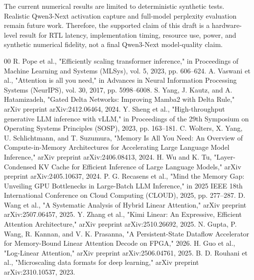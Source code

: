 \documentclass[conference]{IEEEtran}
\begin{document}
The current numerical results are limited to deterministic synthetic tests. Realistic Qwen3-Next activation capture and full-model perplexity evaluation remain future work. Therefore, the supported claim of this draft is a hardware-level result for RTL latency, implementation timing, resource use, power, and synthetic numerical fidelity, not a final Qwen3-Next model-quality claim.

\begin{thebibliography}{00}
 R. Pope et al., "Efficiently scaling transformer inference," in Proceedings of Machine Learning and Systems (MLSys), vol. 5, 2023, pp. 606--624.
 A. Vaswani et al., "Attention is all you need," in Advances in Neural Information Processing Systems (NeurIPS), vol. 30, 2017, pp. 5998--6008.
 S. Yang, J. Kautz, and A. Hatamizadeh, "Gated Delta Networks: Improving Mamba2 with Delta Rule," arXiv preprint arXiv:2412.06464, 2024.
 Y. Sheng et al., "High-throughput generative LLM inference with vLLM," in Proceedings of the 29th Symposium on Operating Systems Principles (SOSP), 2023, pp. 163--181.
 C. Wolters, X. Yang, U. Schlichtmann, and T. Suzumura, "Memory Is All You Need: An Overview of Compute-in-Memory Architectures for Accelerating Large Language Model Inference," arXiv preprint arXiv:2406.08413, 2024.
 H. Wu and K. Tu, "Layer-Condensed KV Cache for Efficient Inference of Large Language Models," arXiv preprint arXiv:2405.10637, 2024.
 P. G. Recasens et al., "Mind the Memory Gap: Unveiling GPU Bottlenecks in Large-Batch LLM Inference," in 2025 IEEE 18th International Conference on Cloud Computing (CLOUD), 2025, pp. 277--287.
 D. Wang et al., "A Systematic Analysis of Hybrid Linear Attention," arXiv preprint arXiv:2507.06457, 2025.
 Y. Zhang et al., "Kimi Linear: An Expressive, Efficient Attention Architecture," arXiv preprint arXiv:2510.26692, 2025.
 N. Gupta, P. Wang, R. Kannan, and V. K. Prasanna, "A Persistent-State Dataflow Accelerator for Memory-Bound Linear Attention Decode on FPGA," 2026.
 H. Guo et al., "Log-Linear Attention," arXiv preprint arXiv:2506.04761, 2025.
 B. D. Rouhani et al., "Microscaling data formats for deep learning," arXiv preprint arXiv:2310.10537, 2023.
\end{thebibliography}
\end{document}
